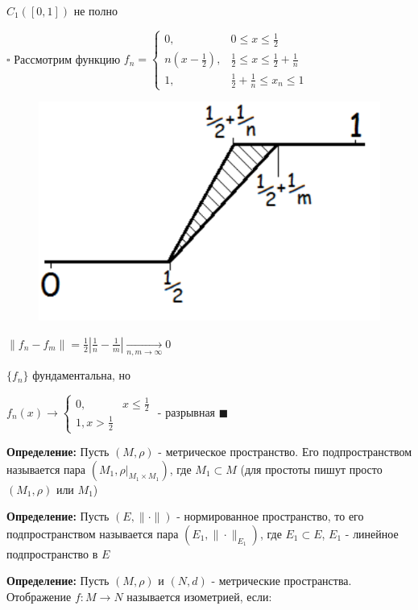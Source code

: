 \documentclass[a4paper]{report}
\begin{document}
$C_1([0,1])$ не полно

$\square$ Рассмотрим функцию $f_n=\begin{cases}0,&0\le x\le\frac12\\n(x-\frac12),&\frac12\le x\le\frac12+\frac1n\\1,&\frac12+\frac1n\le x_n\le1\end{cases}$

\begin{figure}
\includegraphics[width=\linewidth]{2}
\end{figure}

\noindent
$\|f_n-f_m\|=\frac12|\frac1n-\frac1m|\xrightarrow[n,m\to\infty]{}0$

\noindent
$\{f_n\}$ фундаментальна, но

$f_n(x)\to\begin{cases}0,&x\le\frac12\\1,x>\frac12\end{cases}$ - разрывная $\blacksquare$

\bigskip
\bigskip
\bigskip
\noindent\textbf{Определение:} Пусть $(M,\rho)$ - метрическое пространство. Его подпространством называется пара $(M_1,\rho|_{M_1\times M_1})$,
где $M_1\subset M$ (для простоты пишут просто $(M_1,\rho)$ или $M_1$)
\bigskip

\noindent\textbf{Определение:} Пусть $(E,\|\cdot\|)$ -  нормированное пространство, то его подпространством называется пара
$(E_1,\|\cdot\|_{E_1})$, где $E_1\subset E$, $E_1$ - линейное подпространство в $E$
\bigskip

\noindent\textbf{Определение:} Пусть $(M,\rho)$ и $(N,d)$ - метрические пространства. Отображение $f\colon M\to N$ называется
изометрией, если:
\end{document}
